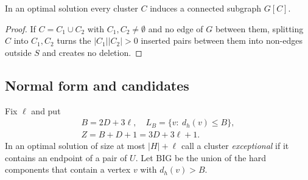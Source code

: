 \begin{lemma}\label{lem:conn}
In an optimal solution every cluster $C$ induces a connected subgraph $G[C]$.
\end{lemma}
\begin{proof}
If $C=C_1\cup C_2$ with $C_1,C_2\neq\emptyset$ and no edge of $G$ between them, splitting $C$ into $C_1,C_2$ turns the $|C_1||C_2|>0$ inserted pairs between them into non-edges outside $S$ and creates no deletion.
\end{proof}

\subsection{Normal form and candidates}
Fix $\ell$ and put
\[
\begin{gathered}B=2D+3\ell,\quad L_B=\{v:\ d_h(v)\le B\},\\ Z=B+D+1=3D+3\ell+1.\end{gathered}
\]
In an optimal solution of size at most $|H|+\ell$ call a cluster \emph{exceptional} if it contains an endpoint of a pair of $U$. Let $\mathrm{BIG}$ be the union of the hard components that contain a vertex $v$ with $d_h(v)>B$.

